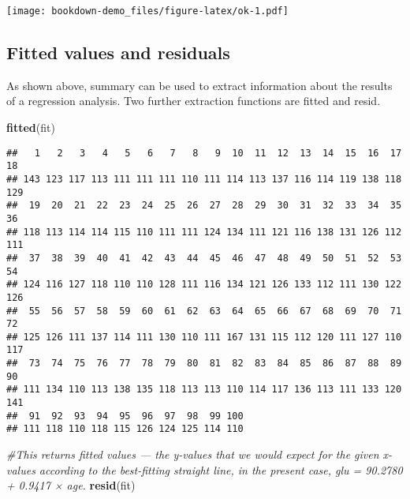 \documentclass[]{book}
\newenvironment{Shaded}{\begin{snugshade}}{\end{snugshade}}
\newcommand{\KeywordTok}[1]{\textcolor[rgb]{0.13,0.29,0.53}{\textbf{#1}}}
\newcommand{\CommentTok}[1]{\textcolor[rgb]{0.56,0.35,0.01}{\textit{#1}}}
\newcommand{\NormalTok}[1]{#1}
\theoremstyle{definition}
\theoremstyle{definition}
\theoremstyle{definition}
\theoremstyle{remark}
\begin{document}
\texttt{[image: bookdown-demo\_files/figure-latex/ok-1.pdf]}

\subsection{Fitted values and
residuals}\label{fitted-values-and-residuals}

As shown above, summary can be used to extract information about the
results of a regression analysis. Two further extraction functions are
fitted and resid.

\begin{Shaded}
\begin{Highlighting}[]
\KeywordTok{fitted}\NormalTok{(fit)}
\end{Highlighting}
\end{Shaded}

\begin{verbatim}
##   1   2   3   4   5   6   7   8   9  10  11  12  13  14  15  16  17  18 
## 143 123 117 113 111 111 111 110 111 114 113 137 116 114 119 138 118 129 
##  19  20  21  22  23  24  25  26  27  28  29  30  31  32  33  34  35  36 
## 118 113 114 114 115 110 111 111 124 134 111 121 116 138 131 126 112 111 
##  37  38  39  40  41  42  43  44  45  46  47  48  49  50  51  52  53  54 
## 124 116 127 118 110 110 128 111 116 134 121 126 133 112 111 130 122 126 
##  55  56  57  58  59  60  61  62  63  64  65  66  67  68  69  70  71  72 
## 125 126 111 137 114 111 130 110 111 167 131 115 112 120 111 127 110 117 
##  73  74  75  76  77  78  79  80  81  82  83  84  85  86  87  88  89  90 
## 111 134 110 113 138 135 118 113 113 110 114 117 136 113 111 133 120 141 
##  91  92  93  94  95  96  97  98  99 100 
## 111 118 110 118 115 126 124 125 114 110
\end{verbatim}

\begin{Shaded}
\begin{Highlighting}[]
\CommentTok{#This returns fitted values — the y-values that we would expect for the given x-values according to the best-fitting straight line, in the present case, glu = 90.2780 + 0.9417 × age.}
\KeywordTok{resid}\NormalTok{(fit)}
\end{Highlighting}
\end{Shaded}
\end{document}
